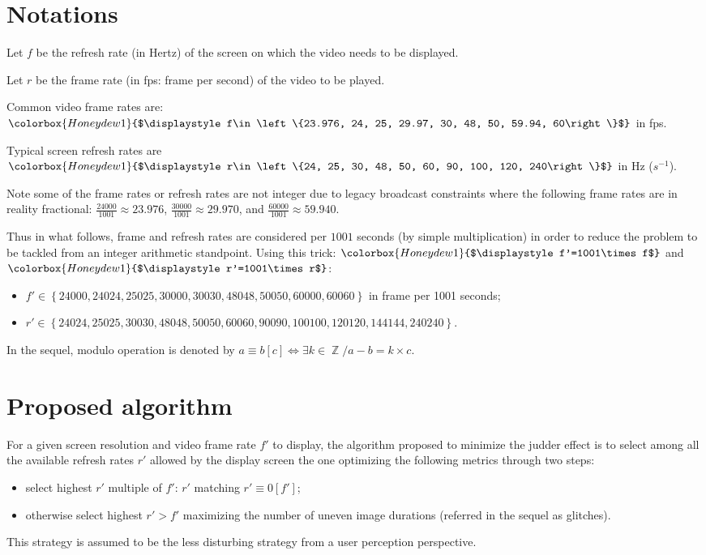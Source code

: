 \documentclass[11pt,a4paper]{article}
\newcommand{\resm}[1]{\colorbox{Honeydew1}{$\displaystyle #1$}}
\DeclareMathOperator{\ZZ}{\mathbb{Z}}
\theoremstyle{plain}
\theoremstyle{definition}
\theoremstyle{remark}
\begin{document}
\section{Notations}

Let $f$ be the refresh rate (in Hertz) of the screen on which the video needs to be displayed.

Let $r$ be the frame rate (in fps: frame per second) of the video to be played.

Common video frame rates are: $\resm{f\in \left\{23.976, 24, 25, 29.97, 30, 48, 50, 59.94, 60\right\}}$ in fps.

Typical screen refresh rates are $\resm{r\in \left\{24, 25, 30, 48, 50, 60, 90, 100, 120, 240\right\}}$ in Hz ($s^{-1}$).

Note some of the frame rates or refresh rates are not integer due to legacy broadcast constraints where the following frame rates are in reality fractional:
$\frac{24000}{1001}\approx 23.976$,
$\frac{30000}{1001}\approx 29.970$,
and $\frac{60000}{1001}\approx 59.940$.

Thus in what follows, frame and refresh rates are considered per $1001$ seconds (by simple multiplication) in order to reduce the problem to be tackled from an integer arithmetic standpoint. Using this trick: $\resm{f'=1001\times f}$ and $\resm{r'=1001\times r}$:
\begin{itemize}
\item $f'\in \left\{24000, 24024, 25025, 30000, 30030, 48048, 50050, 60000, 60060\right\}$ in frame per 1001 seconds;
\item $r'\in \left\{24024, 25025, 30030, 48048, 50050, 60060, 90090, 100100, 120120, 144144, 240240\right\}$.
\end{itemize}

In the sequel, modulo operation is denoted by $a \equiv b [c]\iff\exists k\in\ZZ / a-b=k\times c$.

\section{Proposed algorithm}

For a given screen resolution and video frame rate $f'$ to display, the algorithm proposed to minimize the judder effect is to select among all the available refresh rates $r'$ allowed by the display screen the one optimizing the following metrics through two steps:
\begin{itemize}
	\item select highest $r'$ multiple of $f'$: $r'$ matching $r' \equiv 0 [f']$;
	\item otherwise select highest $r'>f'$ maximizing the number of uneven image durations (referred in the sequel as glitches).
\end{itemize}
This strategy is assumed to be the less disturbing strategy from a user perception perspective.
\end{document}
